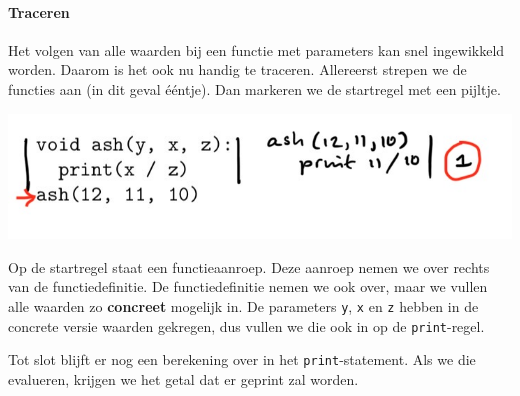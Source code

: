 \paragraph{Traceren}

Het volgen van alle waarden bij een functie met parameters kan snel ingewikkeld worden. Daarom is het ook nu handig te traceren. Allereerst strepen we de functies aan (in dit geval \'e\'entje). Dan markeren we de startregel met een pijltje.

\includegraphics[width=.8\textwidth]{2-trace-params.jpeg}

Op de startregel staat een functieaanroep. Deze aanroep nemen we over rechts van de functiedefinitie. De functiedefinitie nemen we ook over, maar we vullen alle waarden zo \textbf{concreet} mogelijk in. De parameters \texttt{y}, \texttt{x} en \texttt{z} hebben in de concrete versie waarden gekregen, dus vullen we die ook in op de \texttt{print}-regel.

Tot slot blijft er nog een berekening over in het \texttt{print}-statement. Als we die evalueren, krijgen we het getal dat er geprint zal worden.

